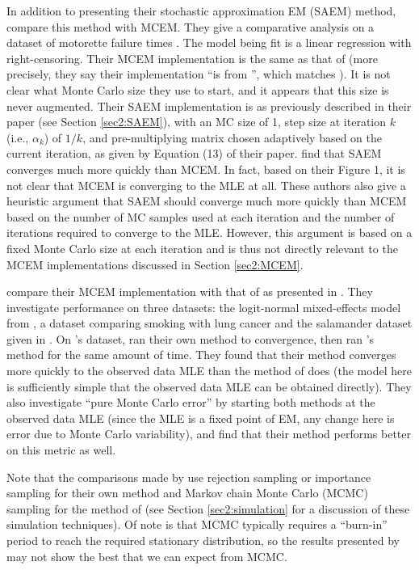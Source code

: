 \documentclass[11pt, oneside]{article}   	%
\begin{document}
In addition to presenting their stochastic approximation EM (SAEM) method, \citet{Gu98I} compare this method with MCEM. They give a comparative analysis on a dataset of motorette failure times \citep[see][for a diagram and explanation of what a motorette is]{Rai16}. The model being fit is a linear regression with right-censoring. Their MCEM implementation is the same as that of \citet{Wei90} (more precisely, they say their implementation ``is from \citet{Tan93}'', which matches \citeauthor{Wei90}). It is not clear what Monte Carlo size they use to start, and it appears that this size is never augmented. Their SAEM implementation is as previously described in their paper (see Section \ref{sec2:SAEM}), with an MC size of 1, step size at iteration $k$ (i.e., $\alpha_k$) of $1/k$, and pre-multiplying matrix chosen adaptively based on the current iteration, as given by Equation (13) of their paper. \citeauthor{Gu98I} find that SAEM converges much more quickly than MCEM. In fact, based on their Figure 1, it is not clear that MCEM is converging to the MLE at all. These authors also give a heuristic argument that SAEM should converge much more quickly than MCEM based on the number of MC samples used at each iteration and the number of iterations required to converge to the MLE. However, this argument is based on a fixed Monte Carlo size at each iteration and is thus not directly relevant to the MCEM implementations discussed in Section \ref{sec2:MCEM}.

\citet{Boo99} compare their MCEM implementation with that of \citet{Wei90} as presented in \citet{McC97}. They investigate performance on three datasets: the logit-normal mixed-effects model from \citet{McC97}, a dataset comparing smoking with lung cancer \citep{Dor54} and the salamander dataset given in \citet{McC89}. On \citeauthor{McC97}'s dataset, \citeauthor{Boo99} ran their own method to convergence, then ran \citeauthor{Wei90}'s method for the same amount of time. They found that their method converges more quickly to the observed data MLE than the method of \citeauthor{Wei90} does (the model here is sufficiently simple that the observed data MLE can be obtained directly). They also investigate ``pure Monte Carlo error'' by starting both methods at the observed data MLE (since the MLE is a fixed point of EM, any change here is error due to Monte Carlo variability), and find that their method performs better on this metric as well.

Note that the comparisons made by \citeauthor{Boo99} use rejection sampling or importance sampling for their own method and Markov chain Monte Carlo (MCMC) sampling for the method of \citet{Wei90} (see Section \ref{sec2:simulation} for a discussion of these simulation techniques). Of note is that MCMC typically requires a ``burn-in'' period to reach the required stationary distribution, so the results presented by \citeauthor{Boo99} may not show the best that we can expect from MCMC.
\end{document}
